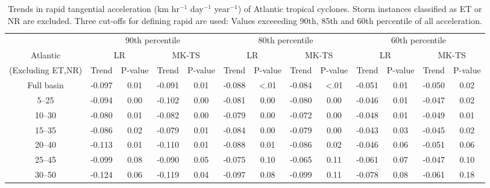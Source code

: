 \documentclass[wcd,manuscript]{copernicus}
\begin{document}
\begin{table*}[t]
  \caption{Trends in rapid tangential acceleration (km hr$^{-1}$ day$^{-1}$ year$^{-1}$) of Atlantic tropical cyclones. Storm instances  classified as ET or NR are excluded. Three cut-offs for defining rapid are used: Values exceeeding 90th, 85th and 60th percentile of all acceleration. }

\begin{tabular}{|c|cccc|cccc|cccc|}
\hline
& \multicolumn{4}{|c|}{ 90th percentile } & \multicolumn{4}{|c|}{80th percentile }& \multicolumn{4}{|c|}{60th percentile}\\
Atlantic  & \multicolumn{2}{c}{LR} & \multicolumn{2}{c|}{MK-TS}& \multicolumn{2}{c}{LR} & \multicolumn{2}{c|}{MK-TS} & \multicolumn{2}{c}{LR} &  \multicolumn{2}{c|}{MK-TS}\\
(Excluding ET,NR) & Trend & P-value & Trend & P-value & Trend & P-value & Trend & P-value & Trend & P-value & Trend & P-value\\
\hline
Full basin  & -0.097 & 0.01 & -0.091 & 0.01 & -0.088 &  <.01 & -0.084 &  <.01 & -0.051 & 0.01 & -0.050 & 0.02 \\
	  5--25 & -0.094 & 0.00 & -0.102 & 0.00   & -0.081 & 0.00 & -0.080 & 0.00 & -0.046 & 0.01 & -0.047 & 0.02\\
	 10--30 & -0.080 & 0.01 & -0.082 & 0.00   & -0.079 & 0.00 & -0.072 & 0.00 & -0.048 & 0.01 & -0.049 & 0.01\\
	 15--35 & -0.086 & 0.02 & -0.079 & 0.01   & -0.084 & 0.00 & -0.079 & 0.00 & -0.043 & 0.03 & -0.045 & 0.02\\
	 20--40 & -0.113 & 0.01 & -0.110 & 0.01   & -0.088 & 0.01 & -0.086 & 0.02 & -0.046 & 0.06 & -0.051 & 0.06\\
	 25--45 & -0.099 & 0.08 & -0.090 & 0.05   & -0.075 & 0.10 & -0.065 & 0.11 & -0.061 & 0.07 & -0.047 & 0.10\\
	 30--50 & -0.124 & 0.06 & -0.119 & 0.04   & -0.097 & 0.08 & -0.099 & 0.11 & -0.078 & 0.08 & -0.061 & 0.18\\
\hline
\hline
\end{tabular}
\label{tab:ATLAC}
\end{table*}




\end{document}
